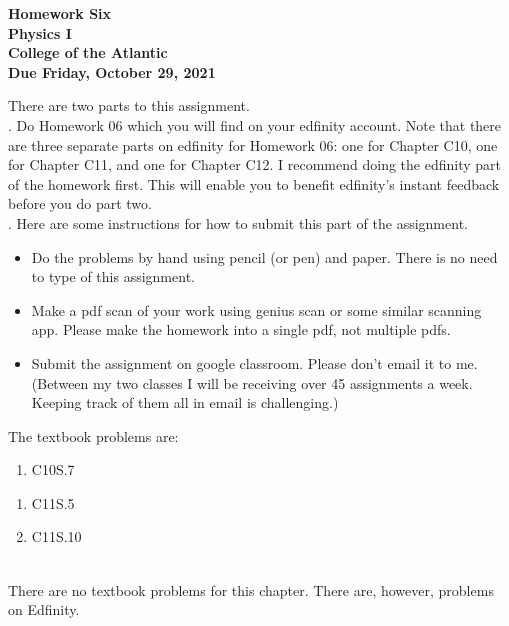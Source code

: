 \documentclass[12pt]{article}
\begin{document}
\pagestyle{empty}
 
\begin{center}
{\LARGE {\bf Homework Six}}\\
\bigskip
{\Large {\bf Physics I}}\\
\bigskip
{\Large {\bf College of the Atlantic}}\\
\bigskip
{ {\bf Due Friday, October 29, 2021}}\\ 
\end{center}
\medskip

\noindent There are two parts to this assignment.\\


.  Do Homework 06 which you will find
on your edfinity account.  Note that there are three separate parts on
edfinity for Homework 06: one for Chapter C10, one for Chapter C11,
and one for Chapter C12.  I recommend doing the edfinity part of the
homework first.  This will enable you to benefit edfinity's instant
feedback before you do part two.\\ 


.  Here are some
instructions for how to submit this part of the assignment.
\begin{itemize}
\item Do the problems by hand using pencil (or pen) and paper.
  There is no need to type of this assignment.
\item Make a pdf scan of your work using genius scan or some
  similar scanning app.  Please make the homework into a single
  pdf, not multiple pdfs.
\item Submit the assignment on google classroom.  Please don't
  email it to me.  (Between my two classes I will be receiving
  over 45 assignments a week.  Keeping track of them all in email
  is challenging.)\\
\end{itemize}

\noindent The textbook problems are:\\   

  \begin{enumerate}
  \item C10S.7\\
  \end{enumerate}

  \begin{enumerate}
  \item C11S.5
  \item C11S.10\\
  \end{enumerate}
  
\\
There are no textbook problems for this chapter.  There are, however,
problems on Edfinity.
\end{document}
